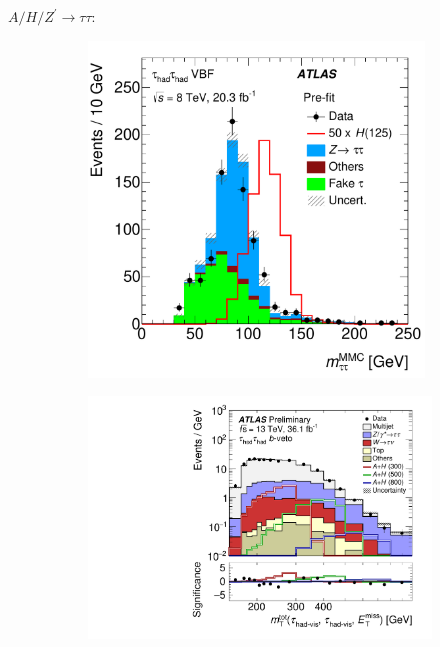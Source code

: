 $A/H/Z^\prime \to \tau\tau$:


\begin{figure}[htb]
  \begin{subfigure}[t]{0.48\textwidth}
    \centering
    \includegraphics[width=0.98\textwidth]{./figures/theory/htautau_mass_2.pdf}
    \label{fig:mtautau_mmc}
  \end{subfigure}\hfill
  \begin{subfigure}[t]{0.48\textwidth}
    \centering
    \includegraphics[width=1.0\textwidth]{./figures/theory/zprime_mttot.pdf}
    \label{fig:mttot_mssm}
  \end{subfigure}
  \caption{}
\end{figure}


